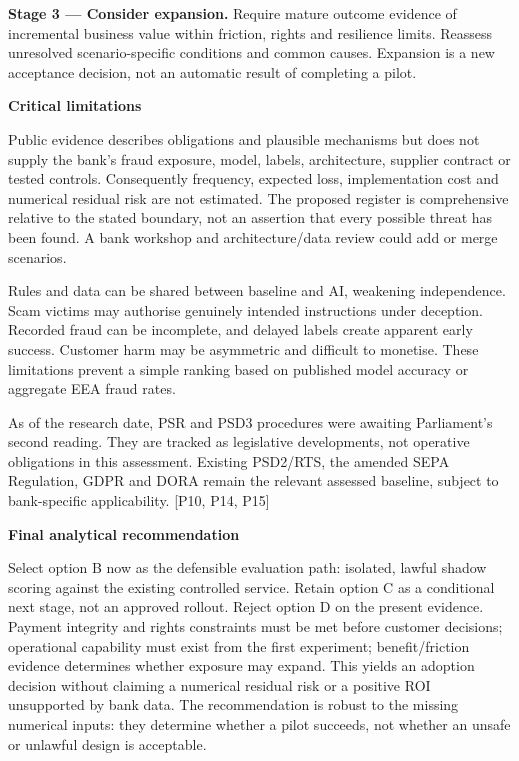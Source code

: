 \documentclass[11pt,a4paper]{article}
\newcommand{\sub}[1]{\par\vspace{2mm}\textbf{\color{ink}#1}\par}
\newcommand{\src}[1]{{\small[#1]}}
\begin{document}
\textbf{Stage 3 --- Consider expansion.} Require mature outcome evidence of incremental business value within friction, rights and resilience limits. Reassess unresolved scenario-specific conditions and common causes. Expansion is a new acceptance decision, not an automatic result of completing a pilot.
\sub{Critical limitations}
Public evidence describes obligations and plausible mechanisms but does not supply the bank's fraud exposure, model, labels, architecture, supplier contract or tested controls. Consequently frequency, expected loss, implementation cost and numerical residual risk are not estimated. The proposed register is comprehensive relative to the stated boundary, not an assertion that every possible threat has been found. A bank workshop and architecture/data review could add or merge scenarios.

Rules and data can be shared between baseline and AI, weakening independence. Scam victims may authorise genuinely intended instructions under deception. Recorded fraud can be incomplete, and delayed labels create apparent early success. Customer harm may be asymmetric and difficult to monetise. These limitations prevent a simple ranking based on published model accuracy or aggregate EEA fraud rates.

As of the research date, PSR and PSD3 procedures were awaiting Parliament's second reading. They are tracked as legislative developments, not operative obligations in this assessment. Existing PSD2/RTS, the amended SEPA Regulation, GDPR and DORA remain the relevant assessed baseline, subject to bank-specific applicability. \src{P10, P14, P15}
\sub{Final analytical recommendation}
Select option B now as the defensible evaluation path: isolated, lawful shadow scoring against the existing controlled service. Retain option C as a conditional next stage, not an approved rollout. Reject option D on the present evidence. Payment integrity and rights constraints must be met before customer decisions; operational capability must exist from the first experiment; benefit/friction evidence determines whether exposure may expand. This yields an adoption decision without claiming a numerical residual risk or a positive ROI unsupported by bank data. The recommendation is robust to the missing numerical inputs: they determine whether a pilot succeeds, not whether an unsafe or unlawful design is acceptable.
\end{document}
